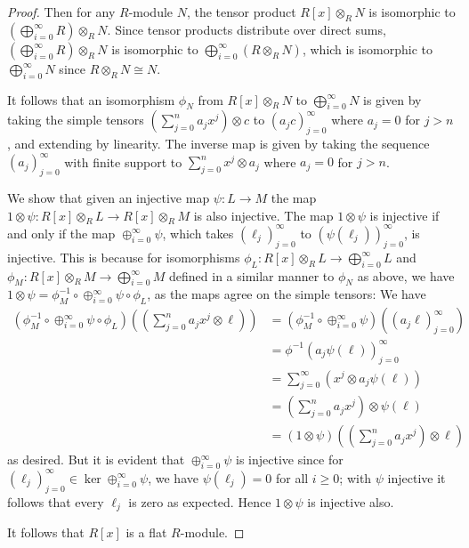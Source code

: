 \documentclass[11pt]{article}
\begin{document}
\begin{enumerate}
\begin{proof}
        Then for any $R$-module $N$, the tensor product $R[x]\otimes_R N$ is isomorphic to $(\bigoplus_{i=0}^\infty R)\otimes_R N$. Since tensor products distribute over direct sums, $(\bigoplus_{i=0}^\infty R)\otimes_R N$ is isomorphic to $\bigoplus_{i=0}^\infty (R\otimes_R N)$, which is isomorphic to $\bigoplus_{i=0}^\infty N$ since $R\otimes_R N\cong N$. 
        
        It follows that an isomorphism $\phi_N$ from $R[x]\otimes_R N$ to $\bigoplus_{i=0}^\infty N$ is given by taking the simple tensors $(\sum_{j=0}^n a_jx^j)\otimes c$ to $(a_j c)_{j=0}^\infty$ where $a_j = 0$ for $j>n$, and extending by linearity. The inverse map is given by taking the sequence $(a_j)_{j=0}^\infty$ with finite support to $\sum_{j=0}^n x^j\otimes a_j$ where $a_j = 0$ for $j>n$.

        We show that given an injective map $\psi\colon L\to M$ the map $1\otimes \psi\colon R[x]\otimes_R L\to R[x]\otimes_R M$ is also injective. The map $1\otimes \psi$ is injective if and only if the map $\oplus_{i=0}^\infty \psi$, which takes $(\ell_j)_{j=0}^\infty$ to $(\psi(\ell_j))_{j=0}^\infty$, is injective. This is because for isomorphisms $\phi_L\colon R[x]\otimes_R L \to \bigoplus_{i=0}^\infty L$ and $\phi_M\colon R[x]\otimes_R M \to \bigoplus_{i=0}^\infty M$ defined in a similar manner to $\phi_N$ as above, we have $1\otimes\psi = \phi_M^{-1}\circ \oplus_{i=0}^\infty \psi \circ \phi_L$, as the maps agree on the simple tensors: We have \begin{align*}
            (\phi_M^{-1}\circ \oplus_{i=0}^\infty \psi \circ \phi_L)((\sum_{j=0}^n a_jx^j\otimes \ell)) &= (\phi_M^{-1}\circ \oplus_{i=0}^\infty \psi)((a_j\ell)_{j=0}^\infty) \\
            &= \phi^{-1}(a_j\psi(\ell))_{j=0}^\infty \\
            &= \sum_{j=0}^\infty(x^j\otimes a_j\psi(\ell)) \\
            &= (\sum_{j=0}^na_jx^j)\otimes \psi(\ell) \\
            &= (1\otimes\psi)((\sum_{j=0}^na_jx^j)\otimes \ell)
        \end{align*} as desired. But it is evident that $\oplus_{i=0}^\infty \psi$ is injective since for $(\ell_j)_{j=0}^\infty\in \ker \oplus_{i=0}^\infty \psi$, we have $\psi(\ell_j) = 0$ for all $i\geq 0$; with $\psi$ injective it follows that every $\ell_j$ is zero as expected. Hence $1\otimes \psi$ is injective also. 

        It follows that $R[x]$ is a flat $R$-module.
    \end{proof}
\end{enumerate}
\end{document}
